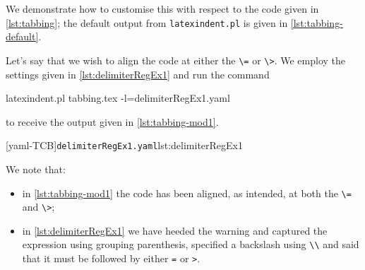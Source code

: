  \begin{example}
 We demonstrate how to customise this with respect to the code given in
 \cref{lst:tabbing}; the default output from \lstinline!latexindent.pl! is given in
 \cref{lst:tabbing-default}.

 \begin{cmhtcbraster}
 \end{cmhtcbraster}

 Let's say that we wish to align the code at either the \lstinline!\=! or \lstinline!\>!.
 We employ the settings given in \cref{lst:delimiterRegEx1} and run the command

 \begin{commandshell}
latexindent.pl tabbing.tex -l=delimiterRegEx1.yaml
\end{commandshell}

 to receive the output given in \cref{lst:tabbing-mod1}. 

 \begin{cmhtcbraster}
  [yaml-TCB]{\texttt{delimiterRegEx1.yaml}}{lst:delimiterRegEx1}
 \end{cmhtcbraster}
 We note that:
 \begin{itemize}
  \item in \cref{lst:tabbing-mod1} the code has been aligned, as intended, at both the
        \lstinline!\=! and \lstinline!\>!;
  \item in \cref{lst:delimiterRegEx1} we have heeded the warning and captured the
        expression using grouping parenthesis, specified a backslash using \lstinline!\\!
        and said that it must be followed by either \lstinline!=! or \lstinline!>!.
 \end{itemize}
 \end{example}

